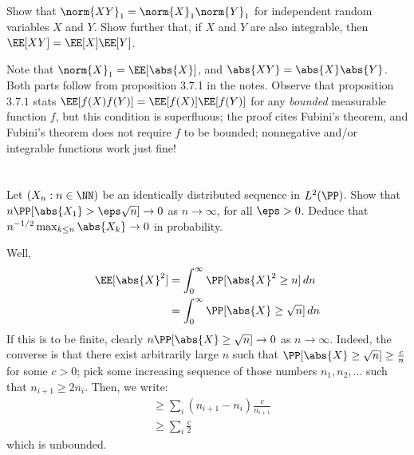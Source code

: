 \documentclass[11pt, headheight=30pt]{scrartcl}
\begin{document}
\section{}
\begin{prob*}
    Show that $\norm{XY}_1 = \norm{X}_1\norm{Y}_1$ for independent random variables $X$ and $Y$.
    Show further that, if $X$ and $Y$ are also integrable, then $\EE[XY] = \EE[X]\EE[Y]$.
\end{prob*}


Note that $\norm{X}_1 = \EE[\abs{X}]$, and $\abs{XY} = \abs{X}\abs{Y}$.
Both parts follow from proposition 3.7.1 in the notes. Observe that proposition
$3.7.1$ stats $\EE[f(X)f(Y)] = \EE[f(X)]\EE[f(Y)]$ for any \emph{bounded}
measurable function $f$, but this condition is superfluous; the proof cites
Fubini's theorem, and Fubini's theorem does not require $f$ to be bounded;
nonnegative and/or integrable functions work just fine!

\section{}
\begin{prob*}
    Let $(X_n : n \in \NN)$ be an identically distributed sequence in $L^2(\PP)$. Show that
    $n\PP[\abs{X_1} > \eps\sqrt{n}] \to 0$ as $n \to \infty$, for all $\eps > 0$. Deduce that
    $n^{-1/2} \max_{k \leq n} \abs{X_k} \to 0$ in probability.
\end{prob*}

Well,
\begin{align*}
    \EE[\abs{X}^2] &= \int_0^\infty \PP[\abs{X}^2 \geq n] \, dn \\
    &= \int_0^\infty \PP[\abs{X} \geq \sqrt{n}] \, dn
\end{align*}
If this is to be finite, clearly $n\PP[\abs{X} \geq \sqrt{n}] \to 0$
as $n \to \infty$. Indeed, the converse is that
there exist arbitrarily large $n$ such that
$\PP[\abs{X}\geq \sqrt{n}] \geq \frac{c}{n}$ for some $c > 0$;
pick some increasing sequence of those numbers $n_1, n_2,\dots$
such that $n_{i+1}\geq 2n_i$.
Then, we write:
\begin{align*}
    &\geq \sum_i (n_{i+1} - n_i) \frac{c}{n_{i+1}}\\
    &\geq \sum_i \frac{c}{2}
\end{align*}
which is unbounded.
\end{document}
